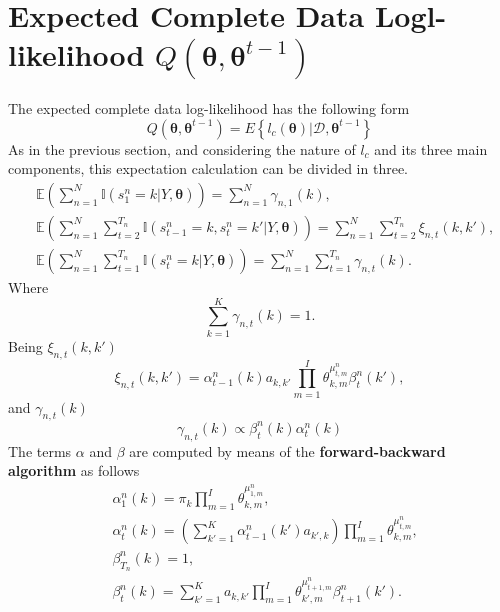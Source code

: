 \documentclass[12pt]{article}
\newcommand{\indicator}{\mathbb{I}}
\newcommand{\expectation}{\mathbb{E}}
\newcommand{\bs}{\boldsymbol}
\begin{document}
\section{Expected Complete Data Logl-likelihood $Q \left( \boldsymbol { \theta } , \boldsymbol { \theta } ^ { t - 1 } \right)$}
The expected complete data log-likelihood has the following form
\begin{equation}
Q \left( \boldsymbol { \theta } , \boldsymbol { \theta } ^ { t - 1 } \right) = E \left\{ l _ { c } ( \boldsymbol { \theta } ) | \mathcal { D } , \boldsymbol { \theta } ^ { t - 1 } \right\}
\end{equation}
As in the previous section, and considering the nature of $l_{c}$ and its three main components, this expectation calculation can be divided in three.
\begin{align}
& \expectation \left( \sum _ { n = 1 } ^ { N } \indicator \left( s _ { 1 } ^ { n } = k | Y , \bs\theta \right) \right) = \sum _ { n = 1 } ^ { N } \gamma _ { n , 1 } ( k ), \\
& \expectation \left( \sum _ { n = 1 } ^ { N } \sum _ { t = 2 } ^ { T _ { n } } \indicator \left( s _ { t - 1 } ^ { n } = k , s _ { t } ^ { n } = k' | Y , \bs\theta \right) \right) = \sum _ { n = 1 } ^ { N } \sum _ { t = 2 } ^ { T _ { n } } \xi _ { n , t } ( k , k' ), \\
& \expectation \left( \sum _ { n = 1 } ^ { N } \sum _ { t = 1 } ^ { T _ { n } } \indicator \left( s _ { t } ^ { n } = k | Y , \bs\theta \right) \right) = \sum _ { n = 1 } ^ { N } \sum _ { t = 1 } ^ { T _ { n } } \gamma _ { n , t } ( k ).
\end{align}
Where 
\begin{equation}
\sum _ { k = 1 } ^ { K } \gamma _ { n , t } ( k ) = 1.
\end{equation}
\noindent Being $\xi _ { n,t } ( k , k' )$ 
\begin{equation}
\xi _ { n,t } ( k , k' ) = \alpha _ { t-1 }^{n} ( k ) a _ { k,k' } \prod\limits_{m=1}^{I} \theta_{k,m}^{\mu^{n}_{t,m}} \beta _ { t }^{n} ( k' ),
\end{equation}
and $ \gamma _ { n , t } ( k ) $
\begin{equation}\label{eq:gamma}
\gamma _ { n , t } ( k )\propto \beta _ { t }^{n} ( k )\alpha _ { t }^{n} ( k )
\end{equation}
The terms $\alpha$ and $\beta$ are computed by means of the \textbf{forward-backward algorithm }as follows
\begin{align}
\label{alfabeta}
&\alpha _ { 1 }^{n} ( k ) = \pi _ { k } \prod\limits_{m=1}^{I}\theta_{k,m}^{\mu^{n}_{1,m}}, \\
&\alpha _ { t }^{n} ( k ) = \left( \sum _ { k' = 1 } ^ { K } \alpha _ { t - 1 }^{n} ( k' ) a _ { k',k } \right) \prod\limits_{m=1}^{I}\theta_{k,m}^{\mu^{n}_{t,m}}, \\
&\beta _ { T_{n} }^{n} ( k ) = 1, \\
& \beta _ { t }^{n} ( k ) = \sum _ {k' = 1 } ^ { K } a _ { k,k'}  \prod\limits_{m=1}^{I}\theta_{k',m}^{\mu^{n}_{t+1,m}}  \beta _ { t + 1 }^{n} ( k' ).
\end{align}
\end{document}
